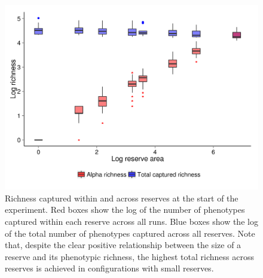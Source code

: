 \documentclass[letterpaper]{article}
\begin{document}
\begin{figure}[h]
	\centering
	\includegraphics[]{CapturedRichness.png}
    \caption{Richness captured within and across reserves at the start of the experiment. Red boxes show the log of the number of phenotypes captured within each reserve across all runs. Blue boxes show the log of the total number of phenotypes captured across all reserves. Note that, despite the clear positive relationship between the size of a reserve and its phenotypic richness, the highest total richness across reserves is achieved in configurations with small reserves.}
%
%
%
%
    \label{fig:capturedrichness}
\end{figure}
\end{document}
